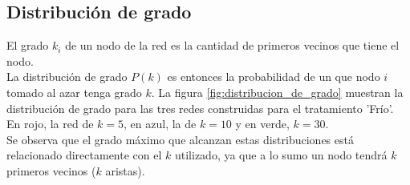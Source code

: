 \subsection*{Distribución de grado}
El grado $k_i$ de un nodo de la red es la cantidad de primeros vecinos que tiene el nodo.\\
La distribución de grado $P(k)$ es entonces la probabilidad de un que nodo $i$ tomado al azar tenga grado $k$. La figura \ref{fig:distribucion_de_grado} muestran la distribución de grado para las tres redes construidas para el tratamiento 'Frío'. En rojo, la red de $k=5$, en azul, la de $k=10$ y en verde, $k=30$. \\
Se observa que el grado máximo que alcanzan estas distribuciones está relacionado directamente con el $k$ utilizado, ya que a lo sumo un nodo tendrá $k$ primeros vecinos ($k$ aristas).
